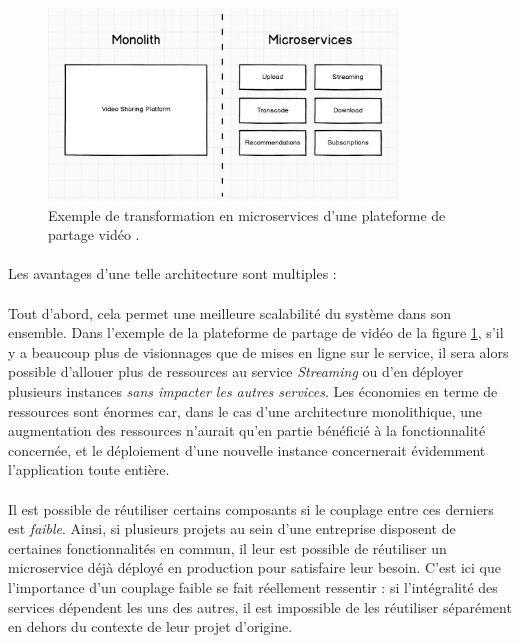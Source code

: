 \begin{figure}[ht]
    \centering
    \includegraphics[width=350px]{chapters/02/images/monolith_to_microservices.png}
    \caption{\label{monolith_to_microservices}Exemple de transformation en microservices d'une plateforme de partage vidéo \cite{Microservices1}.}
\end{figure}

\paragraph{} Les avantages d'une telle architecture sont multiples :

\paragraph{} Tout d'abord, cela permet une meilleure scalabilité du système dans son ensemble. Dans l'exemple de la plateforme
de partage de vidéo de la figure \ref{monolith_to_microservices}, s'il y a beaucoup plus de visionnages que de mises en 
ligne sur le service, il sera alors possible d'allouer plus de ressources au service \emph{Streaming} ou d'en déployer
plusieurs instances \emph{sans impacter les autres services}. Les économies en terme de ressources sont énormes car, dans 
le cas d'une architecture monolithique, une augmentation des ressources n'aurait qu'en partie bénéficié à la fonctionnalité 
concernée, et le déploiement d'une nouvelle instance concernerait évidemment l'application toute entière.

\paragraph{} Il est possible de réutiliser certains composants si le couplage entre ces derniers est \emph{faible}.
Ainsi, si plusieurs projets au sein d'une entreprise disposent de certaines fonctionnalités en commun, il leur est possible 
de réutiliser un microservice déjà déployé en production pour satisfaire leur besoin. C'est ici que l'importance d'un couplage
faible se fait réellement ressentir : si l'intégralité des services dépendent les uns des autres, il est impossible de les
réutiliser séparément en dehors du contexte de leur projet d'origine.

